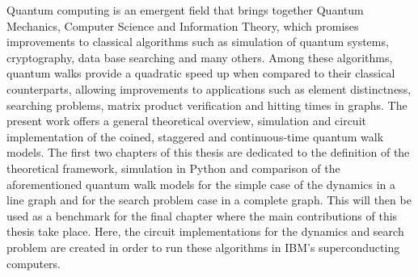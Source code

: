 \documentclass[../../dissertation.tex]{subfiles}
\begin{document}
Quantum computing is an emergent field that brings together Quantum Mechanics,
Computer Science and Information Theory, which promises improvements to
classical algorithms such as simulation of quantum systems, cryptography, data
base searching and many others.  Among these algorithms, quantum walks provide
a quadratic speed up when compared to their classical  counterparts,  allowing
improvements to applications such as element distinctness, searching problems,
matrix product verification and hitting times in graphs.  The present work
offers a general theoretical overview, simulation and circuit implementation of
the coined, staggered and continuous-time quantum walk models. The first two
chapters of this thesis are dedicated to the definition of the theoretical
framework, simulation in Python and comparison of the aforementioned quantum
walk models for the simple case of the dynamics in a line graph and for the
search problem case in a complete graph. This will then be used as a benchmark
for the final chapter where the main contributions of this thesis take place.
Here, the circuit implementations for the dynamics and search problem are
created in order to run these algorithms in IBM's superconducting computers.
\end{document}
